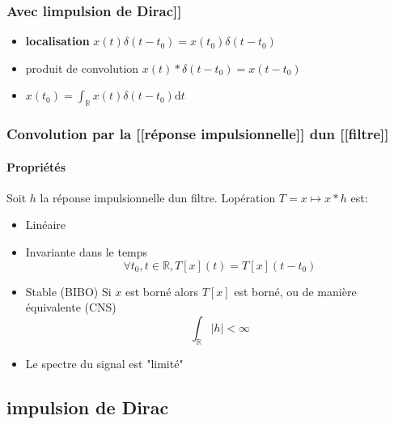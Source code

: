 \documentclass[
]{article}
\providecommand{\tightlist}{%
  \setlength{\itemsep}{0pt}\setlength{\parskip}{0pt}}
\begin{document}
\hypertarget{avec-limpulsion-de-dirac}{%
\subsubsection{Avec l\textquotesingle{[}{[}impulsion de
Dirac{]}{]}}\label{avec-limpulsion-de-dirac}}

\begin{itemize}
\tightlist
\item
  \textbf{localisation} \(x(t)\delta(t-t_0) = x(t_0)\delta(t-t_0)\)
\item
  produit de convolution \(x(t)\ast \delta(t-t_0) = x(t-t_0)\)
\item
  \(x(t_0) = \int_\mathbb{R} x(t) \delta(t-t_0) \mathrm{d}t\)
\end{itemize}

\hypertarget{convolution-par-la-ruxe9ponse-impulsionnelle-dun-filtre}{%
\subsubsection{Convolution par la {[}{[}réponse impulsionnelle{]}{]}
d\textquotesingle un
{[}{[}filtre{]}{]}}\label{convolution-par-la-ruxe9ponse-impulsionnelle-dun-filtre}}

\hypertarget{propriuxe9tuxe9s-2}{%
\paragraph{Propriétés}\label{propriuxe9tuxe9s-2}}

Soit \(h\) la réponse impulsionnelle d\textquotesingle un filtre.
L\textquotesingle opération \(T = x \mapsto x \ast h\) est:

\begin{itemize}
\tightlist
\item
  Linéaire
\item
  Invariante dans le temps
  \[\forall t_0, t \in \mathbb{R}, T[x](t) = T[x](t-t_0)\]
\item
  Stable (BIBO) Si \(x\) est borné alors \(T[x]\) est borné, ou de
  manière équivalente (CNS) \[\int_\mathbb{R} |h| < \infty\]
\item
  Le spectre du signal est "limité"
\end{itemize}

\hypertarget{impulsion-de-dirac}{%
\subsection{impulsion de Dirac}\label{impulsion-de-dirac}}
\end{document}
